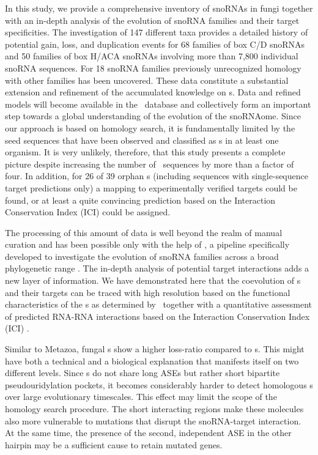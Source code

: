 
In this study, we provide a comprehensive inventory of snoRNAs in fungi
together with an in-depth analysis of the evolution of snoRNA families and
their target specificities. The investigation of 147 different taxa
provides a detailed history of potential gain, loss, and duplication events
for 68 families of box C/D snoRNAs and 50 families of box H/ACA snoRNAs
involving more than 7,800 individual snoRNA sequences. For 18 snoRNA
families previously unrecognized homology with other families has been
uncovered. These data constitute a substantial extension and refinement of
the accumulated knowledge on \sno{}s. Data and refined models will become
available in the \rfam\ database and collectively form an important step
towards a global understanding of the evolution of the snoRNAome. Since our
approach is based on homology search, it is fundamentally limited by the
seed sequences that have been observed and classified as \sno{}s in at
least one organism. It is very unlikely, therefore, that this study
presents a complete picture despite increasing the number of \sno\ sequences
by more than a factor of four. In addition, for 26 of 39 orphan \sno
s (including sequences with single-sequence target predictions only) a
mapping to experimentally verified targets could be found, or at least a
quite convincing prediction based on the Interaction Conservation Index
(ICI) could be assigned.

The processing of this amount of data is well beyond the realm of manual
curation and has been possible only with the help of \snostrip, a pipeline
specifically developed to investigate the evolution of snoRNA families
across a broad phylogenetic range \cite{Bartschat:2014}.  The in-depth
analysis of potential target interactions adds a new layer of
information. We have demonstrated here that the coevolution of \sno s and
their targets can be traced with high resolution based on the functional
characteristics of the \sno s as determined by \snostrip\ together with a
quantitative assessment of predicted RNA-RNA interactions based on the 
Interaction Conservation Index (ICI) \cite{Kehr:2014}.

Similar to Metazoa, fungal \haca s show a higher loss-ratio compared
to \cd s. This might have both a technical and a biological
explanation that manifests itself on two different levels. Since \haca
s do not share long ASEs but rather short bipartite pseudouridylation
pockets, it becomes considerably harder to detect homologous \sno s
over large evolutionary timescales. This effect may limit the scope of
the homology search procedure. The short interacting regions make
these molecules also more vulnerable to mutations that disrupt the
snoRNA-target interaction. At the same time, the presence of the
second, independent ASE in the other hairpin may be a sufficient cause
to retain mutated genes.


